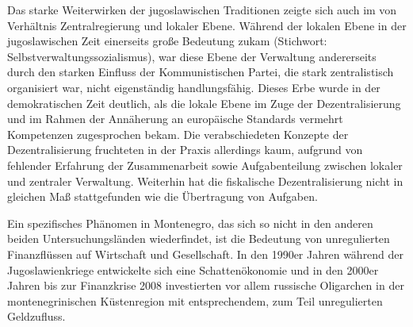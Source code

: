 Das starke Weiterwirken der jugoslawischen Traditionen zeigte sich auch im von Verhältnis Zentralregierung und lokaler Ebene. Während der lokalen Ebene in der jugoslawischen Zeit einerseits große Bedeutung zukam (Stichwort: Selbstverwaltungssozialismus), war diese Ebene der Verwaltung andererseits durch den starken Einfluss der Kommunistischen Partei, die stark zentralistisch organisiert war, nicht eigenständig handlungsfähig. Dieses Erbe wurde in der demokratischen Zeit deutlich, als die lokale Ebene im Zuge der Dezentralisierung und im Rahmen der Annäherung an europäische Standards vermehrt Kompetenzen zugesprochen bekam. Die verabschiedeten Konzepte der Dezentralisierung fruchteten in der Praxis allerdings kaum, aufgrund von fehlender Erfahrung der Zusammenarbeit sowie Aufgabenteilung zwischen lokaler und zentraler Verwaltung. Weiterhin hat die fiskalische Dezentralisierung nicht in gleichen Maß stattgefunden wie die Übertragung von Aufgaben.
\par
Ein spezifisches Phänomen in Montenegro, das sich so nicht in den anderen beiden Untersuchungsländen wiederfindet, ist die Bedeutung von unregulierten Finanzflüssen auf Wirtschaft und Gesellschaft. In den 1990er Jahren während der Jugoslawienkriege entwickelte sich eine Schattenökonomie und in den 2000er Jahren bis zur Finanzkrise 2008 investierten vor allem russische Oligarchen in der montenegrinischen Küstenregion mit entsprechendem, zum Teil unregulierten Geldzufluss.
